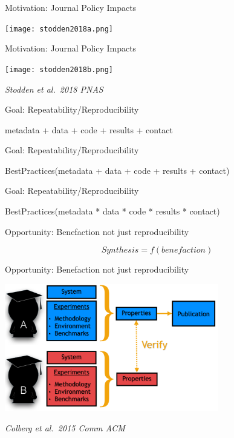 \documentclass[ignorenonframetext,]{beamer}
\begin{document}
\begin{frame}{Motivation: Journal Policy Impacts}
\protect\hypertarget{motivation-journal-policy-impacts-1}{}

\texttt{[image: stodden2018a.png]}

\end{frame}

\begin{frame}{Motivation: Journal Policy Impacts}
\protect\hypertarget{motivation-journal-policy-impacts-2}{}

\texttt{[image: stodden2018b.png]}

\emph{Stodden et al.~2018 PNAS}

\end{frame}

\begin{frame}{Goal: Repeatability/Reproducibility}
\protect\hypertarget{goal-repeatabilityreproducibility}{}

metadata + data + code + results + contact

\end{frame}

\begin{frame}{Goal: Repeatability/Reproducibility}
\protect\hypertarget{goal-repeatabilityreproducibility-1}{}

BestPractices(metadata + data + code + results + contact)

\end{frame}

\begin{frame}{Goal: Repeatability/Reproducibility}
\protect\hypertarget{goal-repeatabilityreproducibility-2}{}

BestPractices(metadata * data * code * results * contact)

\end{frame}

\begin{frame}{Opportunity: Benefaction not just reproducibility}
\protect\hypertarget{opportunity-benefaction-not-just-reproducibility}{}

\[ Synthesis = f(benefaction) \]

\end{frame}

\begin{frame}{Opportunity: Benefaction not just reproducibility}
\protect\hypertarget{opportunity-benefaction-not-just-reproducibility-1}{}

\includegraphics[width=0.7\textwidth,height=\textheight]{colberg_repeat.png}

\emph{Colberg et al.~2015 Comm ACM}

\end{frame}
\end{document}
